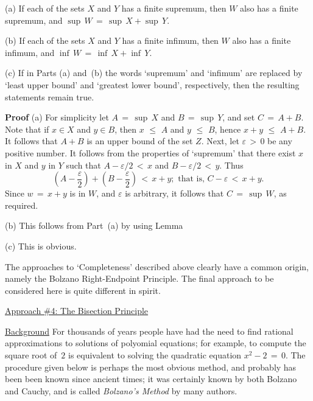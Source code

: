         (a) If each of the sets $X$ and $Y$ has a finite supremum, then $W$ also has a finite supremum, and ${\sup}\,W \,=\, {\sup}\,X + {\sup}\,Y$.

\V

        (b) If each of the sets $X$ and $Y$ has a finite infimum, then $W$ also has a finite infimum, and ${\inf}\,W \,=\, {\inf}\,X + {\inf}\,Y$.

\V

         (c) If in Parts (a) and~(b) the words `supremum' and `infimum' are replaced by `least upper bound' and `greatest lower bound', respectively,
    then the resulting statements remain true.

\V

        {\bf Proof} (a) For simplicity let $A \,=\, {\sup}\,X$ and $B \,=\, {\sup}\,Y$, and set $C \,=\, A+B$.
    Note that if $x{\in}X$ and $y{\in}B$, then $x\,\,{\leq}\,\,A$ and $y\,\,{\leq}\,\,B$, hence $x+y\,\,{\leq}\,\,A+B$.
    It follows that $A+B$ is an upper bound of the set $Z$. Next, let ${\varepsilon}\,>\,0$ be any positive number.
    It follows from the properties of `supremum' that there exist $x$ in $X$ and $y$ in $Y$ such that $A-{\varepsilon}/2\,<\,x$ and $B-{\varepsilon}/2\,<\,y$.
    Thus
        \begin{displaymath}
        \left(A-\frac{{\varepsilon}}{2}\right) + \left(B-\frac{{\varepsilon}}{2}\right)\,<\,x+y; \mbox{ that is, }
        C-{\varepsilon}\,<\,x+y.
        \end{displaymath}
    Since $w \,=\, x+y$ is in $W$, and ${\varepsilon}$ is arbitrary, it follows that $C \,=\, {\sup}\,W$, as required.

\V

        (b) This follows from Part~(a) by using Lemma~

\V

        (c) This is obvious.

\VV

        The approaches to `Completeness' described above clearly have a common origin, namely the Bolzano Right-Endpoint Principle.
    The final approach to be considered here is quite different in spirit.

\VV

        \underline{Approach \#4: The Bisection Principle}

\V

        \underline{Background} For thousands of years people have had the need to find rational approximations to solutions of polyomial equations;
    for example, to compute the square root of~$2$ is equivalent to solving the quadratic equation $x^{2}-2 \,=\, 0$.
    The procedure given below is perhaps the most obvious method, and probably has been been known since ancient times;
    it was certainly known by both Bolzano and Cauchy, and is called {\em Bolzano's Method} by many authors.

